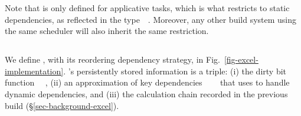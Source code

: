 Note that  is only defined for applicative tasks, which is what
restricts \Make to static dependencies, as reflected in the
type~~. Moreover, any other build system using
the same  scheduler will also inherit the same restriction.

\subsection{\Excel}\label{sec-implementation-excel}

We define \Excel, with its reordering dependency strategy, in  Fig.~\ref{fig-excel-implementation}.
\Excel's persistently stored information is a triple: (i) the dirty bit
function ~\hs{->}~, (ii) an approximation of key dependencies
~\hs{->}~~ that \Excel uses to handle
dynamic dependencies, and (iii) the calculation chain \hs{[@@k]} recorded in the
previous build (\S\ref{sec-background-excel}).

